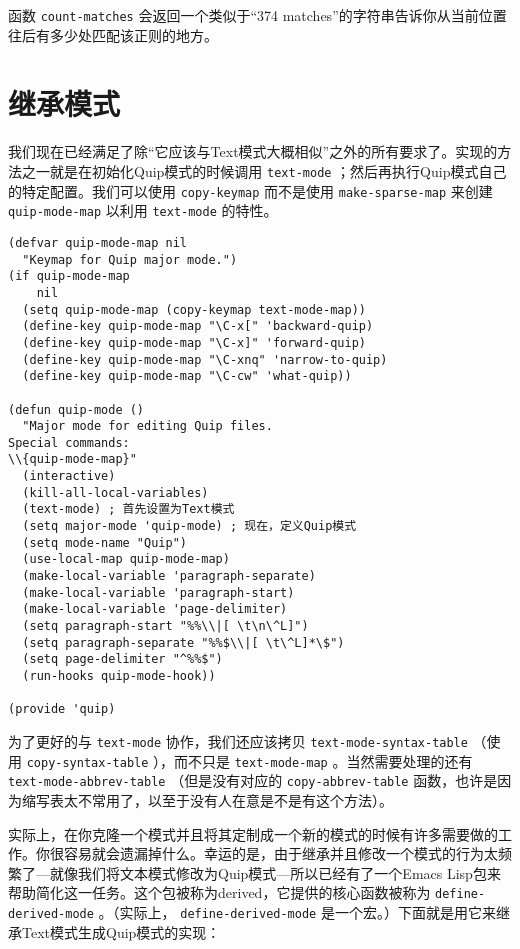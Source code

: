 函数 \texttt{count-matches} 会返回一个类似于“374 matches”的字符串告诉你从当前位置往后有多少处匹配该正则的地方。

\section{继承模式}
\label{section:09-Derived-Modes}

我们现在已经满足了除“它应该与Text模式大概相似”之外的所有要求了。实现的方法之一就是在初始化Quip模式的时候调用 \texttt{text-mode} ；然后再执行Quip模式自己的特定配置。我们可以使用 \texttt{copy-keymap} 而不是使用 \texttt{make-sparse-map} 来创建 \texttt{quip-mode-map} 以利用 \texttt{text-mode} 的特性。

\begin{verbatim}
(defvar quip-mode-map nil
  "Keymap for Quip major mode.")
(if quip-mode-map
    nil
  (setq quip-mode-map (copy-keymap text-mode-map))
  (define-key quip-mode-map "\C-x[" 'backward-quip)
  (define-key quip-mode-map "\C-x]" 'forward-quip)
  (define-key quip-mode-map "\C-xnq" 'narrow-to-quip)
  (define-key quip-mode-map "\C-cw" 'what-quip))

(defun quip-mode ()
  "Major mode for editing Quip files.
Special commands:
\\{quip-mode-map}"
  (interactive)
  (kill-all-local-variables)
  (text-mode) ; 首先设置为Text模式
  (setq major-mode 'quip-mode) ; 现在，定义Quip模式
  (setq mode-name "Quip")
  (use-local-map quip-mode-map)
  (make-local-variable 'paragraph-separate)
  (make-local-variable 'paragraph-start)
  (make-local-variable 'page-delimiter)
  (setq paragraph-start "%%\\|[ \t\n\^L]")
  (setq paragraph-separate "%%$\\|[ \t\^L]*\$")
  (setq page-delimiter "^%%$")
  (run-hooks quip-mode-hook))

(provide 'quip)
\end{verbatim}

为了更好的与 \texttt{text-mode} 协作，我们还应该拷贝 \texttt{text-mode-syntax-table} （使用 \texttt{copy-syntax-table} ），而不只是 \texttt{text-mode-map} 。当然需要处理的还有 \texttt{text-mode-abbrev-table} （但是没有对应的 \texttt{copy-abbrev-table} 函数，也许是因为缩写表太不常用了，以至于没有人在意是不是有这个方法）。

实际上，在你克隆一个模式并且将其定制成一个新的模式的时候有许多需要做的工作。你很容易就会遗漏掉什么。幸运的是，由于继承并且修改一个模式的行为太频繁了---就像我们将文本模式修改为Quip模式---所以已经有了一个Emacs Lisp包来帮助简化这一任务。这个包被称为derived，它提供的核心函数被称为 \texttt{define-derived-mode} 。（实际上， \texttt{define-derived-mode} 是一个宏。）下面就是用它来继承Text模式生成Quip模式的实现：

